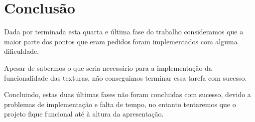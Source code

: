 \chapter{Conclusão}

Dada por terminada esta quarta e última fase do trabalho consideramos que a maior parte dos pontos que eram pedidos foram implementados com alguma dificuldade.

Apesar de sabermos o que seria necessário para a implementação da funcionalidade das texturas, não conseguimos terminar essa tarefa com sucesso. 

Concluindo, estas duas últimas fases não foram concluidas com sucesso, devido a problemas de implementação e falta de tempo, no entanto tentaremos que o projeto fique funcional até à altura da apresentação. 
